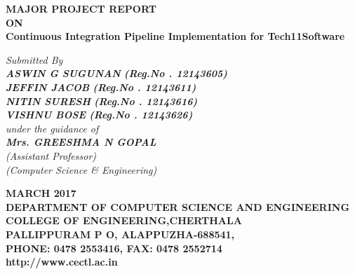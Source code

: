 \documentclass[12pt,a4paper,oneside]{report}
\begin{document}
\renewcommand\bibname{References}
\begin{titlepage}
\begin{center}
\begin{singlespace}
\Large{\textbf{MAJOR PROJECT REPORT}}\\
\Large{\textbf{ON}}\\
\LARGE{\textbf{Continuous Integration Pipeline Implementation for Tech11Software }}\\
\end{singlespace}
\vspace{.2 in}
\Large{\textit{Submitted By }}\\
\Large{\textit{\textbf{ASWIN G SUGUNAN }\textbf{(Reg.No . 12143605)}}} \\
\Large{\textit{\textbf{JEFFIN JACOB  }\textbf{(Reg.No . 12143611)}}} \\
\Large{\textit{\textbf{NITIN SURESH }\textbf{(Reg.No . 12143616)}}} \\
\Large{\textit{\textbf{VISHNU BOSE }\textbf{(Reg.No . 12143626)}}} \\
\Large{\textit{\textit{under the guidance of}}}\\
\Large{\textit{\textbf{Mrs. GREESHMA N GOPAL}}}\\
\Large{\textit{(Assistant Professor)}}\\
\Large{\textit{(Computer Science \& Engineering)}}
\vspace{.05in}
\begin{figure}[h]
\begin{center}
\end{center}
\end{figure}
\begin{singlespace}
\large{\textbf{MARCH 2017}}\\
\vspace{.1in}
\large{\textbf{DEPARTMENT OF COMPUTER SCIENCE AND ENGINEERING\\COLLEGE OF ENGINEERING,CHERTHALA\\ PALLIPPURAM P O, ALAPPUZHA-688541, \\PHONE: 0478 2553416, FAX: 0478 2552714\\http://www.cectl.ac.in}}
\end{singlespace}
\end{center}
\end{titlepage}
\end{document}
